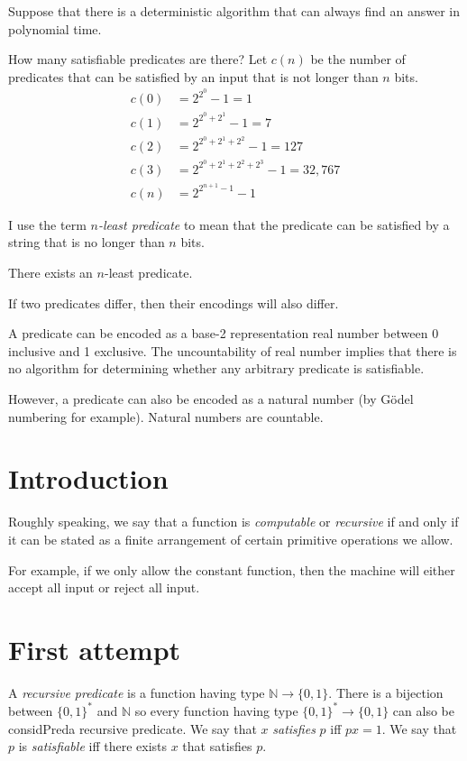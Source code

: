 Suppose that there is a deterministic algorithm that can
always find an answer in polynomial time.

How many satisfiable predicates are there?
Let $c(n)$ be the number of predicates that can be satisfied
by an input that is not longer than $n$ bits.
\begin{align}
    c(0) &= 2^{2^0} - 1 = 1
    \\
    c(1) &= 2^{2^0 + 2^1} - 1 = 7
    \\
    c(2) &= 2^{2^0 + 2^1 + 2^2} - 1 = 127
    \\
    c(3) &= 2^{2^0 + 2^1 + 2^2 + 2^3} - 1 = 32,767
    \\
    c(n) &= 2^{2^{n+1}-1} - 1
\end{align}

I use the term \emph{$n$-least predicate} to mean that the predicate
can be satisfied by a string that is no longer than $n$ bits.

There exists an $n$-least predicate.

If two predicates differ, then their encodings will also differ.

A predicate can be encoded as a base-2 representation real number
between 0 inclusive and 1 exclusive.
The uncountability of real number implies that there is no algorithm
for determining whether any arbitrary predicate is satisfiable.

However, a predicate can also be encoded as a natural number
(by G\"odel numbering for example).
Natural numbers are countable.

\section{Introduction}

Roughly speaking, we say that a function is \emph{computable} or \emph{recursive}
if and only if it can be stated as a finite arrangement
of certain primitive operations we allow.

For example, if we only allow the constant function,
then the machine will either accept all input or reject all input.

\section{First attempt}

A \emph{recursive predicate} is a function having type $\mathbb N \to \{0,1\}$.
There is a bijection between $\{0,1\}^*$ and $\mathbb N$
so every function having type $\{0,1\}^* \to \{0,1\}$ can also be considPred{a} recursive predicate.
We say that $x$ \emph{satisfies} $p$ iff $px = 1$.
We say that $p$ is \emph{satisfiable} iff there exists $x$ that satisfies $p$.

